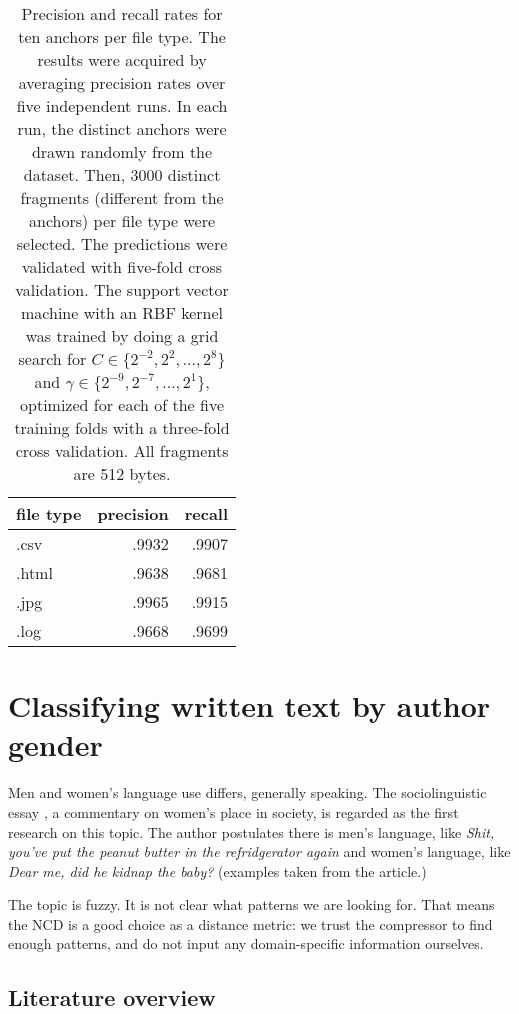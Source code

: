 \begin{table}[h]
  \begin{tabular}{lrr}
  \hline
   file type   &   precision &   recall \\
  \hline
   .csv        &      .9932 &   .9907 \\
   .html       &      .9638 &   .9681 \\
   .jpg        &      .9965 &   .9915 \\
   .log        &      .9668 &   .9699 \\
  \hline
  \end{tabular}
\caption{
Precision and recall rates for ten anchors per file type. The results were acquired by averaging precision rates over five
independent runs. In each run, the distinct anchors were drawn randomly from the dataset.
Then, 3000 distinct fragments (different from the anchors) per file type were selected.
The predictions were validated with five-fold cross validation.
The support vector machine with an RBF kernel was trained by doing a grid search
for $C \in \{ 2^{-2}, 2^{2}, \dots, 2^{8} \}$ and $\gamma \in \{2^{-9},
2^{-7}, \dots, 2^{1} \}$, optimized for each of the five training folds with a three-fold
cross validation. All fragments are 512 bytes.}
\label{table:csv_html_jpg_log_recall_10_anchors}
\end{table}

\section{Classifying written text by author gender}

Men and women's language use differs, generally speaking. The
sociolinguistic essay \cite{Lakoff1973}, a commentary on women's place in
society, is regarded as the first research on this topic. The author
postulates there is men's language, like \emph{Shit, you've put the peanut
butter in the refridgerator again} and women's language, like \emph{Dear
me, did he kidnap the baby?} (examples taken from the article.)

The topic is fuzzy. It is not clear what patterns we are looking for.
That means the NCD is a good choice as a distance metric: we trust the compressor to find enough patterns, and do not input any domain-specific information ourselves.

\subsection{Literature overview}


